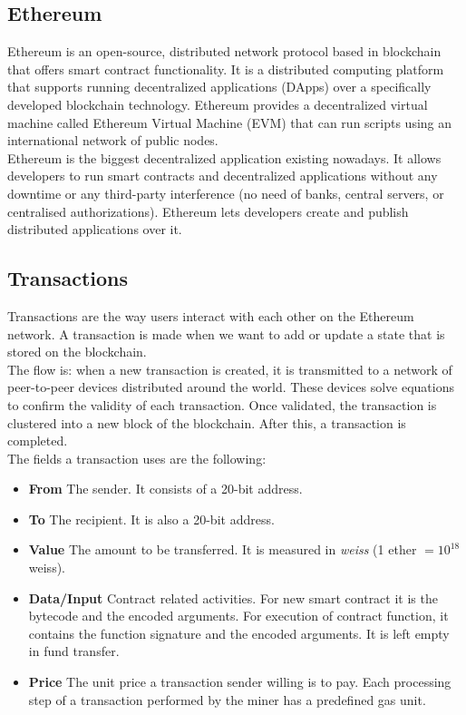 \documentclass[10pt]{article}
\begin{document}
\begin{multicols}{2}
\subsection{Ethereum}

Ethereum is an open-source, distributed network protocol based in blockchain that offers smart contract functionality. It is a distributed computing platform that supports running decentralized applications (DApps) over a specifically developed blockchain technology. Ethereum provides a decentralized virtual machine called Ethereum Virtual Machine (EVM) that can run scripts using an international network of public nodes.\\

Ethereum is the biggest decentralized application existing nowadays. It allows developers to run smart contracts and decentralized applications without any downtime or any third-party interference (no need of banks, central servers, or centralised authorizations). Ethereum lets developers create and publish distributed applications over it.

\subsection{Transactions}

Transactions are the way users interact with each other on the Ethereum network. A transaction is made when we want to add or update a state that is stored on the blockchain.\\

The flow is: when a new transaction is created, it is transmitted to a network of peer-to-peer devices distributed around the world. These devices solve equations to confirm the validity of each transaction. Once validated, the transaction is clustered into a new block of the blockchain. After this, a transaction is completed.\\

The fields a transaction uses are the following:

\begin{itemize}
	\item \textbf{From} The sender. It consists of a 20-bit address. 
	\item \textbf{To} The recipient. It is also a 20-bit address. 
	\item \textbf{Value} The amount to be transferred. It is measured in \textit{weiss} (1 ether \(=10^{18}\) weiss). 
	\item \textbf{Data/Input} Contract related activities. For new smart contract it is the bytecode and the encoded arguments. For execution of contract function, it contains the function signature and the encoded arguments. It is left empty in fund transfer. 
	\item \textbf{Price} The unit price a transaction sender willing is to pay. Each processing step of a transaction performed by the miner has a predefined gas unit. 
\end{itemize}


\end{multicols}
\end{document}
